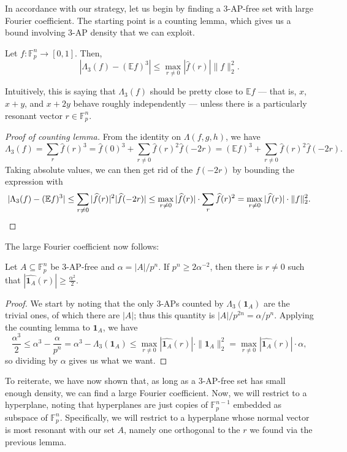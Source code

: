 \documentclass[10pt]{scrartcl}
\providecommand{\EE}{\mathbb E}
\providecommand{\FF}{\mathbb F}
\providecommand{\ind}[1]{\mathbf 1_{#1}}
\providecommand{\abs}[1]{\left|{#1}\right|}
\renewcommand{\hat}{\widehat}
\providecommand{\norm}[1]{\| #1 \|}
\begin{document}
In accordance with our strategy, let us begin by finding a 3-AP-free set
with large Fourier coefficient. The starting point
is a counting lemma, which gives us a bound involving 3-AP density
that we can exploit.
\begin{lemma}
	Let $f\colon\FF_p^n\to[0,1]$. Then,
	\[\abs{\Lambda_3(f) - (\EE f)^3} \le \max_{r\ne 0}|\hat f(r)|\norm f_2^2.\]
\end{lemma}
Intuitively, this is saying that $\Lambda_3(f)$ should be
pretty close to $\EE f$ --- that is, $x$, $x+y$, and $x+2y$
behave roughly independently --- unless there is a particularly
resonant vector $r\in\FF_p^n$.

\begin{proof}[Proof of counting lemma]
	From the identity on $\Lambda(f,g,h)$, we have
	\[\Lambda_3(f) = \sum_r \hat f(r)^3
	= \hat f(0)^3 + \sum_{r\ne 0} \hat f(r)^2\hat f(-2r)
	= (\EE f)^3 + \sum_{r\ne 0} \hat f(r)^2\hat f(-2r).\]
	Taking absolute values,
	we can then get rid of the $f(-2r)$ by bounding the expression with
	\[|\Lambda_3(f) - (\EE f)^3| \le \sum_{r\ne 0} |\hat f(r)|^2|\hat f(-2r)|
	\le \max_{r\ne 0}|\hat f(r)|\cdot \sum_{r}\hat f(r)^2
	= \max_{r\ne 0}|\hat f(r)|\cdot \norm f_2^2.\qedhere\]
\end{proof}

The large Fourier coefficient now follows:
\begin{lemma}
	Let $A\subseteq\FF_p^n$ be 3-AP-free and $\alpha = |A|/p^n$.
	If $p^n \ge 2\alpha^{-2}$, then there is $r\ne0$ such that
	$|\hat {\ind A}(r)|\ge\frac{\alpha^2}2$.
\end{lemma}

\begin{proof}
	We start by noting that the only 3-APs counted by $\Lambda_3(\ind A)$
	are the trivial ones, of which there are $|A|$; thus this quantity is
	$|A|/p^{2n} = \alpha/p^n$.
	Applying the counting lemma to $\ind A$, we have
	\[\frac{\alpha^3}{2}\le
	\alpha^3 - \frac\alpha{p^n} =\alpha^3 - \Lambda_3(\ind A)
	\le \max_{r\ne 0}|\hat{\ind A}(r)|\cdot \norm{\ind A}_2^2
	= \max_{r\ne 0}|\hat{\ind A}(r)|\cdot\alpha,\]
	so dividing by $\alpha$ gives us what we want.
\end{proof}

To reiterate, we have now shown that, as long as a 3-AP-free set
has small enough density, we can find a large Fourier coefficient.
Now, we will restrict to a hyperplane, noting that hyperplanes
are just copies of $\FF_p^{n-1}$ embedded as subspace of $\FF_p^n$.
Specifically, we will restrict to a hyperplane
whose normal vector is most resonant with our set $A$, namely
one orthogonal to the $r$ we found via the previous lemma.
\end{document}
